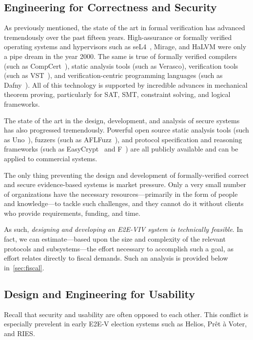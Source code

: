 \subsection{Engineering for Correctness and Security}

As previously mentioned, the state of the art in formal verification
has advanced tremendously over the past fifteen years. High-assurance
or formally verified operating systems and hypervisors such as
seL4~\cite{seL4}, Mirage, and HaLVM were only a pipe dream in the year
2000. The same is true of formally verified compilers (such as
CompCert~\cite{CompCert}), static analysis tools (such as Verasco),
verification tools (such as VST~\cite{VST}), and verification-centric
programming languages (such as Dafny~\cite{Dafny}). All of this
technology is supported by incredible advances in mechanical theorem
proving, particularly for SAT, SMT, constraint solving, and logical
frameworks.

The state of the art in the design, development, and analysis of
secure systems has also progressed tremendously. Powerful open source
static analysis tools (such as Uno~\cite{Uno}), fuzzers (such as
AFLFuzz~\cite{AFLFuzz}), and protocol specification and reasoning
frameworks (such as EasyCrypt~\cite{EasyCrypt} and F\*~\cite{Fstar})
are all publicly available and can be applied to commercial systems.

The only thing preventing the design and development of
formally-verified correct and secure evidence-based systems is market
pressure. Only a very small number of organizations have the necessary
resources---primarily in the form of people and knowledge---to tackle
such challenges, and they cannot do it without clients who provide
requirements, funding, and time.

As such, \emph{designing and developing an E2E-VIV system is
  technically feasible}.  In fact, we can estimate---based upon the
size and complexity of the relevant protocols and subsystems---the
effort necessary to accomplish such a goal, as effort relates directly
to fiscal demands. Such an analysis is provided below
in~\autoref{sec:fiscal}.

\subsection{Design and Engineering for Usability}

Recall that security and usability are often opposed to each other.
This conflict is especially prevelent in early E2E-V election systems
such as Helios, Prêt à Voter, and RIES.

